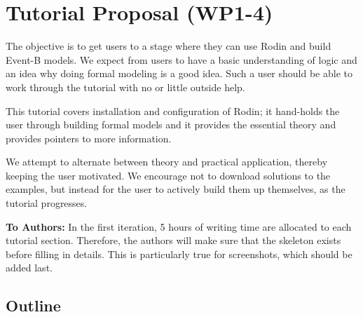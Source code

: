\section*{Tutorial Proposal (WP1-4)}

The objective is to get users to a stage where they can use Rodin and build Event-B models.  We expect from users to have a basic understanding of logic and an idea why doing formal modeling is a good idea.  Such a user should be able to work through the tutorial with no or little outside help.

This tutorial covers installation and configuration of Rodin; it hand-holds the user through building formal models and it provides the essential theory and provides pointers to more information.

We attempt to alternate between theory and practical application, thereby keeping the user motivated.  We encourage not to download solutions to the examples, but instead for the user to actively build them up themselves, as the tutorial progresses.

\textbf{To Authors:} In the first iteration, 5 hours of writing time are allocated to each tutorial section.  Therefore, the authors will make sure that the skeleton exists before filling in details.
This is particularly true for screenshots, which should be added last.

\subsection*{Outline}

